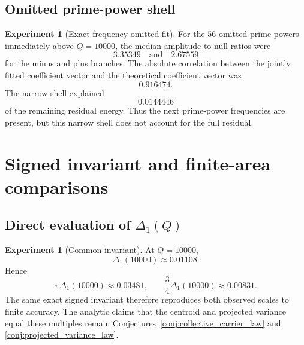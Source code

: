 \documentclass[11pt]{amsart}
\numberwithin{equation}{section}
\theoremstyle{plain}
\theoremstyle{definition}
\newtheorem{experiment}[theorem]{Experiment}
\theoremstyle{remark}
\newcommand{\1}{\mathbf{1}}
\begin{document}
\subsection{Omitted prime-power shell}
\label{subsec:numerical_omitted_shell}

\begin{experiment}[Exact-frequency omitted fit]
\label{exp:numerical_omitted_fit_detailed}
For the $56$ omitted prime powers immediately above $Q=10000$, the median
amplitude-to-null ratios were
\begin{equation}
3.35349
\quad\text{and}\quad
2.67559
\label{eq:numerical_omitted_ratios_detailed}
\end{equation}
for the minus and plus branches.  The absolute correlation between the
jointly fitted coefficient vector and the theoretical coefficient vector was
\begin{equation}
0.916474.
\label{eq:numerical_omitted_correlation_detailed}
\end{equation}
The narrow shell explained
\begin{equation}
0.0144446
\label{eq:numerical_omitted_energy_fraction_detailed}
\end{equation}
of the remaining residual energy.  Thus the next prime-power frequencies
are present, but this narrow shell does not account for the full residual.
\end{experiment}

\section{Signed invariant and finite-area comparisons}
\label{sec:numerical_signed_invariant}

\subsection{Direct evaluation of \texorpdfstring{\(\Delta_1(Q)\)}{Delta1(Q)}}
\label{subsec:numerical_Delta_evaluation}

\begin{experiment}[Common invariant]
\label{exp:numerical_common_invariant}
At $Q=10000$,
\begin{equation}
\Delta_1(10000)\approx0.01108.
\label{eq:numerical_Delta_detailed}
\end{equation}
Hence
\begin{equation}
\pi\Delta_1(10000)\approx0.03481,
\qquad
\frac34\Delta_1(10000)\approx0.00831.
\label{eq:numerical_Delta_multiples_detailed}
\end{equation}
The same exact signed invariant therefore reproduces both observed scales
to finite accuracy.  The analytic claims that the centroid and projected
variance equal these multiples remain Conjectures~\ref{conj:collective_carrier_law}
and \ref{conj:projected_variance_law}.
\end{experiment}
\end{document}
